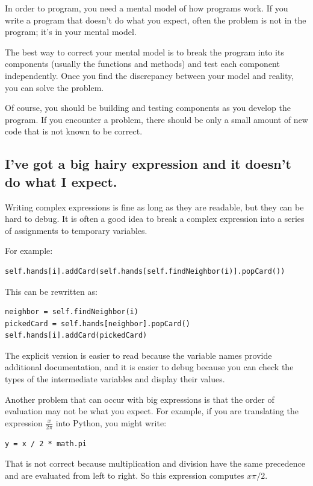 In order to program, you need a mental model of how
programs work.  If you write a program that doesn't do what you expect,
often the problem is not in the program; it's in your mental
model.

The best way to correct your mental model is to break the program
into its components (usually the functions and methods) and test
each component independently.  Once you find the discrepancy
between your model and reality, you can solve the problem.

Of course, you should be building and testing components as you
develop the program.  If you encounter a problem,
there should be only a small amount of new code
that is not known to be correct.


\subsection{I've got a big hairy expression and it doesn't
do what I expect.}

Writing complex expressions is fine as long as they are readable,
but they can be hard to debug.  It is often a good idea to
break a complex expression into a series of assignments to
temporary variables.

For example:

\begin{lstlisting}
self.hands[i].addCard(self.hands[self.findNeighbor(i)].popCard())
\end{lstlisting}
%
This can be rewritten as:

\begin{lstlisting}
neighbor = self.findNeighbor(i)
pickedCard = self.hands[neighbor].popCard()
self.hands[i].addCard(pickedCard)
\end{lstlisting}
%
The explicit version is easier to read because the variable
names provide additional documentation, and it is easier to debug
because you can check the types of the intermediate variables
and display their values.

Another problem that can occur with big expressions is
that the order of evaluation may not be what you expect.
For example, if you are translating the expression
$\frac{x}{2 \pi}$ into Python, you might write:

\begin{lstlisting}
y = x / 2 * math.pi
\end{lstlisting}
%
That is not correct because multiplication and division have
the same precedence and are evaluated from left to right.
So this expression computes $x \pi / 2$.

